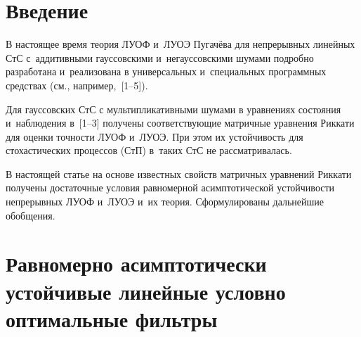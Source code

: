 
\thispagestyle{headings}

\begin{multicols}{2}

\label{st\stat}

\section{Введение}

\vspace*{-2pt}

В настоящее время теория ЛУОФ и~ЛУОЭ Пугачёва для  непрерывных  линейных
СтС с~аддитивными гауссовскими и~негауссовскими шумами
подробно разработана и~реализована в универсальных и~специальных программных
средствах (см., например,~[1--5]).

Для  гауссовских СтС с мультипликативными шумами в уравнениях состояния
и~наблюдения в~[1--3] получены соответствующие матричные уравнения Риккати
для оценки точности ЛУОФ и~ЛУОЭ. При этом их устойчивость для
стохастических процессов (СтП)  в~таких СтС  не рассматривалась.

В настоящей статье на основе известных свойств матричных уравнений
Риккати получены достаточные условия равномерной асимптотической устойчивости
непрерывных ЛУОФ и~ЛУОЭ и~их теория. Сформулированы дальнейшие обобщения.

\vspace*{-6pt}

\section{Равномерно асимптотически устойчивые линейные условно оптимальные фильтры}

\vspace*{-2pt}


\end{multicols}
